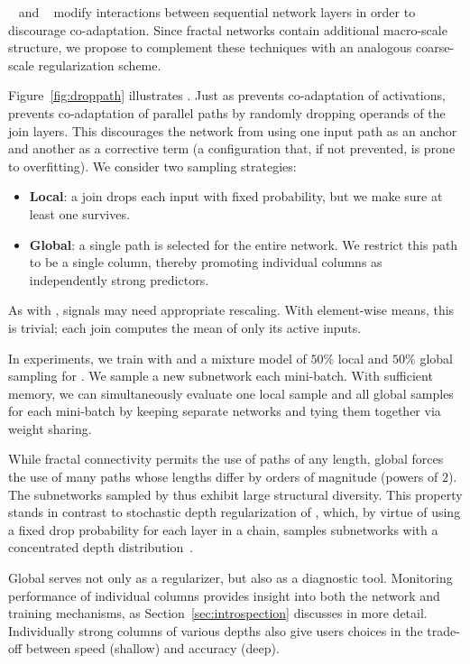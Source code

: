 {\Dropout}~\citep{dropout} and {\dropconn}~\citep{dropconnect} modify
interactions between sequential network layers in order to discourage
co-adaptation.  Since fractal networks contain additional macro-scale
structure, we propose to complement these techniques with an analogous
coarse-scale regularization scheme.

Figure~\ref{fig:droppath} illustrates {\droppath}.  Just as {\dropout} prevents
co-adaptation of activations, {\droppath} prevents co-adaptation of parallel
paths by randomly dropping operands of the $\mathrm{join}$ layers.  This
discourages the network from using one input path as an anchor and another as a
corrective term (a configuration that, if not prevented, is prone to
overfitting).  We consider two sampling strategies:
\begin{itemize}
   \item{
      \textbf{Local}: a $\mathrm{join}$ drops each input with fixed
      probability, but we make sure at least one survives.
   }
   \item{
      \textbf{Global}: a single path is selected for the entire network.
      We restrict this path to be a single column, thereby promoting
      individual columns as independently strong predictors.
   }
\end{itemize}
As with {\dropout}, signals may need appropriate rescaling.  With element-wise
means, this is trivial; each $\mathrm{join}$ computes the mean of only its
active inputs.

In experiments, we train with {\dropout} and a mixture model of $50\%$ local
and $50\%$ global sampling for {\droppath}.  We sample a new subnetwork each
mini-batch.  With sufficient memory, we can simultaneously evaluate one local
sample and all global samples for each mini-batch by keeping separate
networks and tying them together via weight sharing.

While fractal connectivity permits the use of paths of any length, global
{\droppath} forces the use of many paths whose lengths differ by orders of
magnitude (powers of $2$).  The subnetworks sampled by {\droppath} thus exhibit
large structural diversity.  This property stands in contrast to stochastic
depth regularization of {\resnet}, which, by virtue of using a fixed drop
probability for each layer in a chain, samples subnetworks with a concentrated
depth distribution~\citep{huang2016stochasticdepth}.

Global {\droppath} serves not only as a regularizer, but also as a diagnostic
tool.  Monitoring performance of individual columns provides insight into both
the network and training mechanisms, as Section~\ref{sec:introspection}
discusses in more detail.  Individually strong columns of various depths also
give users choices in the trade-off between speed (shallow) and accuracy
(deep).

